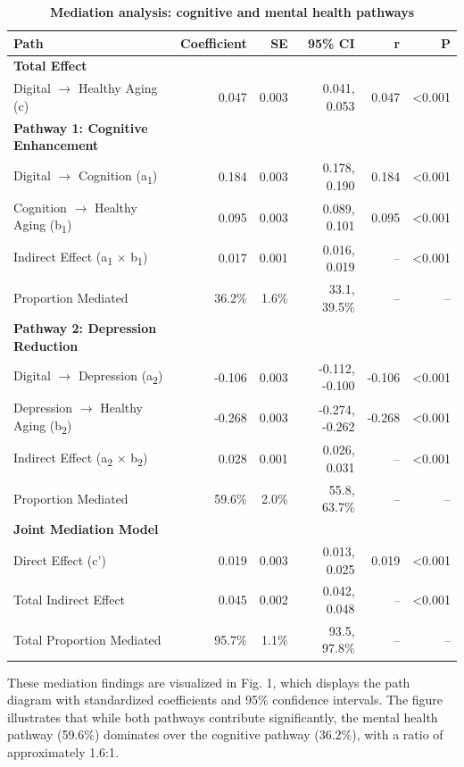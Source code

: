 \documentclass[10pt]{article}
\begin{document}
\begin{table}[h]
\centering
\caption{\textbf{Mediation analysis: cognitive and mental health pathways}}
\small
\begin{tabular}{lrrrrr}
\toprule
\textbf{Path} & \textbf{Coefficient} & \textbf{SE} & \textbf{95\% CI} & \textbf{r} & \textbf{P} \\
\midrule
\textbf{Total Effect} & & & & & \\
Digital $\rightarrow$ Healthy Aging (c) & 0.047 & 0.003 & 0.041, 0.053 & 0.047 & <0.001 \\
\midrule
\textbf{Pathway 1: Cognitive Enhancement} & & & & & \\
Digital $\rightarrow$ Cognition (a\textsubscript{1}) & 0.184 & 0.003 & 0.178, 0.190 & 0.184 & <0.001 \\
Cognition $\rightarrow$ Healthy Aging (b\textsubscript{1}) & 0.095 & 0.003 & 0.089, 0.101 & 0.095 & <0.001 \\
Indirect Effect (a\textsubscript{1} $\times$ b\textsubscript{1}) & 0.017 & 0.001 & 0.016, 0.019 & -- & <0.001 \\
\quad Proportion Mediated & 36.2\% & 1.6\% & 33.1, 39.5\% & -- & -- \\
\midrule
\textbf{Pathway 2: Depression Reduction} & & & & & \\
Digital $\rightarrow$ Depression (a\textsubscript{2}) & -0.106 & 0.003 & -0.112, -0.100 & -0.106 & <0.001 \\
Depression $\rightarrow$ Healthy Aging (b\textsubscript{2}) & -0.268 & 0.003 & -0.274, -0.262 & -0.268 & <0.001 \\
Indirect Effect (a\textsubscript{2} $\times$ b\textsubscript{2}) & 0.028 & 0.001 & 0.026, 0.031 & -- & <0.001 \\
\quad Proportion Mediated & 59.6\% & 2.0\% & 55.8, 63.7\% & -- & -- \\
\midrule
\textbf{Joint Mediation Model} & & & & & \\
Direct Effect (c') & 0.019 & 0.003 & 0.013, 0.025 & 0.019 & <0.001 \\
Total Indirect Effect & 0.045 & 0.002 & 0.042, 0.048 & -- & <0.001 \\
\quad Total Proportion Mediated & 95.7\% & 1.1\% & 93.5, 97.8\% & -- & -- \\
\bottomrule
\end{tabular}
\end{table}

These mediation findings are visualized in Fig. 1, which displays the path diagram with standardized coefficients and 95\% confidence intervals. The figure illustrates that while both pathways contribute significantly, the mental health pathway (59.6\%) dominates over the cognitive pathway (36.2\%), with a ratio of approximately 1.6:1.
\end{document}

